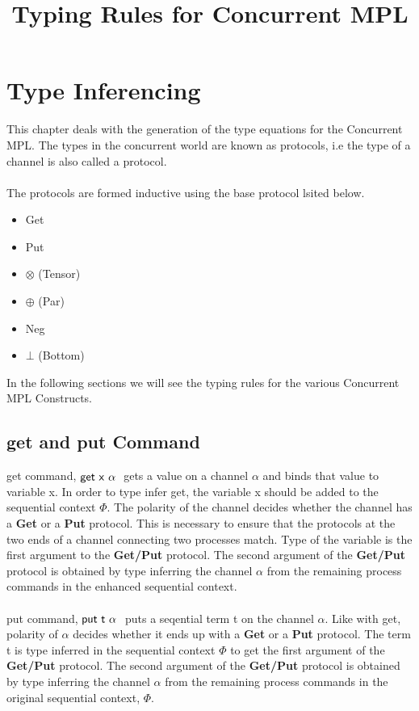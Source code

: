 \documentclass[11pt]{article}
\title{Typing Rules for Concurrent MPL}
\newcommand{\get}{\ensuremath{{\sf get ~ x ~\alpha~}}\xspace}
\newcommand{\putC}{\ensuremath{{\sf put ~ t ~\alpha~}}\xspace}
\begin{document}
\maketitle

\section{Type Inferencing}
This chapter deals with the generation of the type equations for the Concurrent MPL. The types in the concurrent world are known as protocols, i.e the type of a channel is also called a protocol.
~~\\~~\\
The protocols are formed inductive using the base protocol lsited below.
\begin {itemize}
  \item Get
  \item Put
  \item $\otimes$ (Tensor)
  \item $\oplus$ (Par)
  \item Neg
  \item $\bot$ (Bottom)
\end   {itemize} 
 
In the following sections we will see the typing rules for the various Concurrent MPL Constructs.



\subsection {get and put Command}
 {\sf get} command, $\get$ gets a value on a channel $\alpha$ and binds that value to variable x.
In order to type infer {\sf get}, the variable x should be added to the sequential context $\Phi$. The polarity of the channel decides whether the channel has a {\bf Get} or a {\bf Put} protocol. This is necessary to ensure that the protocols at the two ends of a channel connecting two processes match. Type of the variable is the first argument to the {\bf Get/Put} protocol. The second argument of the {\bf Get/Put} protocol is obtained by type inferring the channel $\alpha$ from the remaining process commands in the enhanced sequential context. 
~~\\~~\\
{\sf put} command, $\putC$ puts a seqential term t on the channel $\alpha$. Like with {\sf get}, polarity of $\alpha $ decides whether it ends up with a {\bf Get} or a {\bf Put} protocol. The term t is type inferred in the sequential context $\Phi$ to get the first argument of the {\bf Get/Put} protocol. The second argument of the {\bf Get/Put} protocol is obtained by type inferring the channel $\alpha$ from the remaining process commands in the original sequential context, $\Phi$.  
\end{document}
